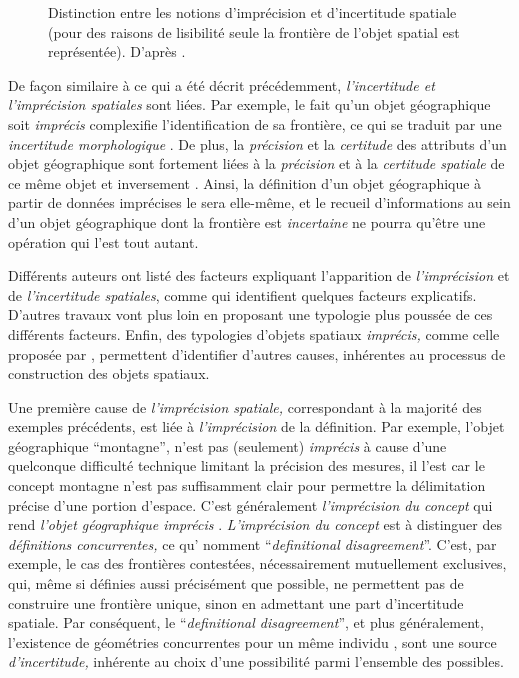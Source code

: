 \begin{figure}
  \centering
  
  \caption{Distinction entre les notions d’imprécision et
    d'incertitude spatiale (pour des raisons de lisibilité seule la
    frontière de l’objet spatial est représentée). D'après
    \textcite{Bunel2020}.}
  \label{fig:inc_vs_imp}
\end{figure}

De façon similaire à ce qui a été décrit précédemment,
\emph{l’incertitude et l’imprécision spatiales} sont liées. Par
exemple, le fait qu’un objet géographique soit \emph{imprécis}
complexifie l’identification de sa frontière, ce qui se traduit par
une \emph{incertitude morphologique} \autocite{Lagacherie1996}. De
plus, la \emph{précision} et la \emph{certitude} des attributs d’un
objet géographique sont fortement liées à la \emph{précision} et à la
\emph{certitude spatiale} de ce même objet et inversement
\autocite{Mark1989}. Ainsi, la définition d’un objet géographique à
partir de données imprécises le sera elle-même, et le recueil
d’informations au sein d’un objet géographique dont la frontière est
\emph{incertaine} ne pourra qu’être une opération qui l’est tout
autant.

Différents auteurs ont listé des facteurs expliquant l’apparition de
\emph{l’imprécision} et de \emph{l’incertitude spatiales}, comme
\textcite{Freksa1996,Dutton1992} qui identifient quelques facteurs
explicatifs. D’autres travaux \autocite{Hadzilacos1996,Evans2008} vont
plus loin en proposant une typologie plus poussée de ces différents
facteurs. Enfin, des typologies d’objets spatiaux \emph{imprécis,}
comme celle proposée par \textcite{Liu2019}, permettent d’identifier
d’autres causes, inhérentes au processus de construction des objets
spatiaux.

Une première cause de \emph{l’imprécision spatiale,} correspondant à
la majorité des exemples précédents, est liée à \emph{l’imprécision
}de la définition. Par exemple, l’objet géographique
\enquote{montagne}, n’est pas (seulement) \emph{imprécis} à cause
d’une quelconque difficulté technique limitant la précision des
mesures, il l’est car le concept montagne n’est pas suffisamment clair
pour permettre la délimitation précise d’une portion d’espace. C’est
généralement \emph{l’imprécision du concept} qui rend \emph{l’objet
  géographique imprécis} \autocite{Freksa1996}. \emph{L’imprécision du
  concept} est à distinguer des \emph{définitions concurrentes,} ce
qu’\textcite{Evans2008} nomment
\foreignquote{english}{\emph{definitional disagreement}}. C’est, par
exemple, le cas des frontières contestées, nécessairement mutuellement
exclusives, qui, même si définies aussi précisément que possible, ne
permettent pas de construire une frontière unique, sinon en admettant
une part d’incertitude spatiale. Par conséquent, le
\foreignquote{english}{\emph{definitional disagreement}}, et plus
généralement, l’existence de géométries concurrentes pour un même
individu \autocite{Hadzilacos1996}, sont une source
\emph{d’incertitude,} inhérente au choix d’une possibilité parmi
l’ensemble des possibles.

